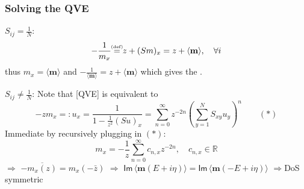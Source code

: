 \documentclass{beamer}
\numberwithin{equation}{section}
\newcommand{\eqbydef}{\mathrel{\stackrel{\hspace*{-3mm}\text{\tiny(def)}\hspace*{-3mm}}{=}}}
\renewcommand{\Im}{\mathsf{Im}\,}
\newcommand{\R}{{\mathbb R }}
\newcommand{\Cr}{\color{red}}
\renewcommand{\emph}[1]{{\Cr{#1}}}
\newcommand{\bemph}[1]{\textbf{\Cr{#1}}}
\begin{document}
\begin{frame}
\frametitle{Solving the QVE}
\bemph{Case} $S_{ij}=\frac{1}{N}$:
$$-\frac{1}{m_x}\eqbydef z+(Sm)_x = z+\langle\mathbf m\rangle, \quad \forall i$$
thus $m_x=\langle\mathbf m\rangle$ and $-\frac{1}{\langle\mathbf m\rangle}=z+\langle\mathbf m\rangle$ which gives the \emph{semicircle law}.

\bemph{Case} $S_{ij}\neq\frac{1}{N}$: Note that [QVE] is equivalent to $$-zm_x=:u_x = \frac{1}{1-\frac{1}{z^2}(Su)_x} = \sum_{n=0}^\infty z^{-2n}\left(\sum_{y=1}^N S_{xy}u_y\right)^n\quad\quad (*)$$
Immediate by recursively plugging in $(*)$: $$m_x = -\frac{1}{z}\sum_{n=0}^\infty c_{n,x}z^{-2n},\quad c_{n,x}\in\R$$ $\Rightarrow$ $-\overline{m_x(z)} = m_x(-\bar z)$ $\Rightarrow$ $\Im\langle\mathbf m(E+i\eta)\rangle=\Im\langle\mathbf m(-E+i\eta)\rangle$ $\Rightarrow$\;DoS symmetric
\end{frame}
\end{document}
